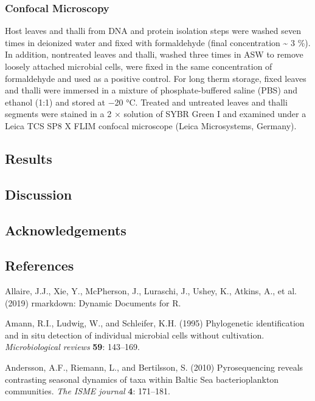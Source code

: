 \documentclass[12pt,]{article}
\begin{document}
\subsubsection{Confocal Microscopy}\label{confocal-microscopy}

Host leaves and thalli from DNA and protein isolation steps were washed
seven times in deionized water and fixed with formaldehyde (final
concentration \textasciitilde{} 3 \si{\percent}). In addition,
nontreated leaves and thalli, washed three times in ASW to remove
loosely attached microbial cells, were fixed in the same concentration
of formaldehyde and used as a positive control. For long therm storage,
fixed leaves and thalli were immersed in a mixture of phosphate-buffered
saline (PBS) and ethanol (1:1) and stored at \num{-20}
\si{\degreeCelsius}. Treated and untreated leaves and thalli segments
were stained in a 2 × solution of SYBR Green I and examined under a
Leica TCS SP8 X FLIM confocal microscope (Leica Microsystems, Germany).

\subsection{Results}\label{results}

\subsection{Discussion}\label{discussion}

\subsection{Acknowledgements}\label{acknowledgements}

\newpage

\subsection{References}\label{references}

\hypertarget{refs}{}
\hypertarget{ref-Allaire2019}{}
Allaire, J.J., Xie, Y., McPherson, J., Luraschi, J., Ushey, K., Atkins,
A., et al. (2019) rmarkdown: Dynamic Documents for R.

\hypertarget{ref-Amann1995}{}
Amann, R.I., Ludwig, W., and Schleifer, K.H. (1995) Phylogenetic
identification and in situ detection of individual microbial cells
without cultivation. \emph{Microbiological reviews} \textbf{59}:
143--169.

\hypertarget{ref-Andersson2010}{}
Andersson, A.F., Riemann, L., and Bertilsson, S. (2010) Pyrosequencing
reveals contrasting seasonal dynamics of taxa within Baltic Sea
bacterioplankton communities. \emph{The ISME journal} \textbf{4}:
171--181.
\end{document}
